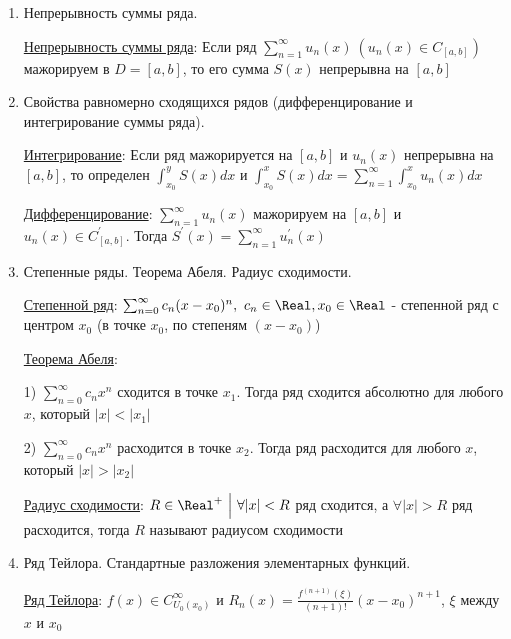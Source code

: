 \documentclass[12pt]{article}
\begin{document}
\begin{enumerate}
    Тогда $\sum_{n = 1}^\infty u_n(x)$ равномерно сходящийся, а $\sum_{n = 1}^\infty \alpha_n$ называют мажорирующим

    \item Непрерывность суммы ряда.

    \hyperlink{functionalsumcontinuity}{Непрерывность суммы ряда}: \Ths Если ряд $\sum_{n = 1}^\infty u_n(x) \ (u_n(x) \in C_{[a, b]})$ мажорируем в $D = [a, b]$, то 
    его сумма $S(x)$ непрерывна на $[a, b]$

    \item Свойства равномерно сходящихся рядов (дифференцирование и интегрирование суммы
    ряда).

    \hyperlink{functionalsumintegral}{Интегрирование}: \Ths Если ряд мажорируется на $[a, b]$ и $u_n(x)$ непрерывна на $[a, b]$, то определен $\int_{x_0}^y S(x)dx$ и 
    $\int_{x_0}^x S(x)dx  = \sum_{n = 1}^\infty \int_{x_0}^x u_n(x) dx$

    \hyperlink{functionalsumderivative}{Дифференцирование}: \Ths $\sum_{n = 1}^\infty u_n(x)$ мажорируем на $[a, b]$ и $u_n(x) \in C^\prime_{[a, b]}$.
    Тогда $S^\prime(x) = \sum_{n = 1}^\infty u^\prime_n(x)$

    \item Степенные ряды. Теорема Абеля. Радиус сходимости.

    \hyperlink{powerseries}{Степенной ряд}: $\sum_{n = 0}^\infty c_n(x - x_0)^n, \ c_n \in \Real, x_0 \in \Real$ - степенной ряд с центром $x_0$ (в точке $x_0$, по степеням $(x - x_0)$)

    \hyperlink{abelstheorem}{Теорема Абеля}:  

    1) $\sum_{n = 0}^\infty c_n x^n$ сходится в точке $x_1$. Тогда ряд сходится абсолютно для любого $x$, который $|x| < |x_1|$

    2) $\sum_{n = 0}^\infty c_n x^n$ расходится в точке $x_2$. Тогда ряд расходится для любого $x$, который $|x| > |x_2|$

    \hyperlink{convergenceradius}{Радиус сходимости}: $R \in \Real^+ \ \Big| \ \forall |x| < R $ ряд сходится, а $\forall |x| > R$ ряд расходится, тогда $R$ называют радиусом сходимости

    \item Ряд Тейлора. Стандартные разложения элементарных функций.

    \hyperlink{taylorsseries}{Ряд Тейлора}: $f(x) \in C^\infty_{U_0(x_0)}$ и $R_n(x) = \frac{f^{(n + 1)}(\xi)}{(n + 1)!} (x - x_0)^{n + 1}$, $\xi$ между $x$ и $x_0$
    

\end{enumerate}
\end{document}
